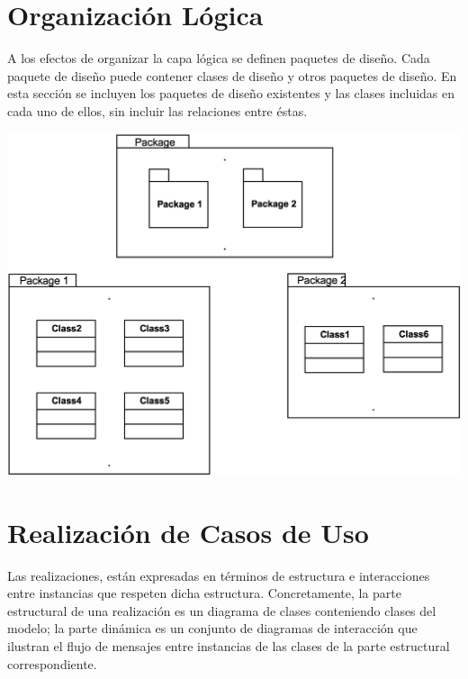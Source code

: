 \documentclass[10pt,spanish]{article}
\numberwithin{figure}{section} %
\begin{document}
\section{Organización Lógica}
A los efectos de organizar la capa lógica se definen paquetes de diseño. Cada paquete de diseño puede contener clases de diseño y otros paquetes de diseño. En esta sección se incluyen los paquetes de diseño existentes y las clases incluidas en cada uno de ellos, sin incluir las relaciones entre éstas.
\begin{siderules}
\centering
\includegraphics[scale=0.41]{ModeloDisenio/Fig2-1.png}
\end{siderules}
\newpage
\section{Realización de Casos de Uso}
Las realizaciones, están expresadas en términos de estructura e interacciones entre instancias que respeten dicha estructura. Concretamente, la parte estructural de una realización es un diagrama de clases conteniendo clases del modelo; la parte dinámica es un conjunto de diagramas de interacción que ilustran el flujo de mensajes entre instancias de las clases de la parte estructural correspondiente. 
\end{document}

